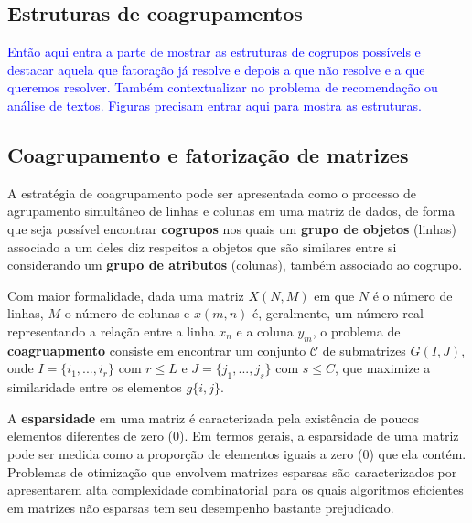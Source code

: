 \documentclass[
    12pt,                %
    oneside,            %
    a4paper,            %
    english,            %
    brazil                %
    ]{abntex2ppgsi}
\begin{document}
\subsection{Estruturas de coagrupamentos}

\textcolor{blue}{Então aqui entra a parte de mostrar as estruturas de cogrupos possívels e destacar aquela que fatoração já resolve e depois a que não resolve e a que queremos resolver. Também contextualizar no problema de recomendação ou análise de textos. Figuras precisam entrar aqui para mostra as estruturas.}

\subsection{Coagrupamento e fatorização de matrizes}

A estratégia de coagrupamento pode ser apresentada como o processo de agrupamento simultâneo de linhas e colunas em uma matriz de dados, de forma que seja possível encontrar \textbf{cogrupos} nos quais um \textbf{grupo de objetos} (linhas) associado a um deles diz respeitos a objetos que são similares entre si considerando um \textbf{grupo de atributos} (colunas), também associado ao cogrupo.

Com maior formalidade, dada uma matriz $X(N,M)$ em que $N$ é o número de linhas, $M$ o número de colunas e $x(m,n)$ é, geralmente, um número real representando a relação entre a linha $x_n$ e a coluna $y_m$, o problema de \textbf{coagruapmento} consiste em encontrar um conjunto $\mathcal{C}$ de submatrizes $G(I,J)$, onde $I=\{i_1, ..., i_r\}$ com $r \leq L$ e $J=\{j_1, ..., j_s\}$ com $s \leq C$, que maximize a similaridade entre os elementos $g\{i,j\}$.


A \textbf{esparsidade} em uma matriz é caracterizada pela existência de poucos elementos diferentes de zero ({0}). Em termos gerais, a esparsidade de uma matriz pode ser medida como a proporção de elementos iguais a zero ($0$) que ela contém. Problemas de otimização que envolvem matrizes esparsas são caracterizados por apresentarem alta complexidade combinatorial para os quais algoritmos eficientes em matrizes não esparsas tem seu desempenho bastante prejudicado.


\end{document}
